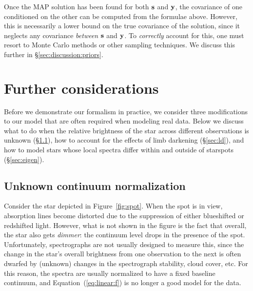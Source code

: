 \documentclass[modern]{aastex631}
\begin{document}
Once the MAP solution has been found for both ${\mathbf{s}}$ and ${\mathbf{y}}$, the covariance of one conditioned on the other can be computed from the formulae above. 
However, this is necessarily a lower bound on the true covariance of the solution, since it neglects any covariance \emph{between} ${\mathbf{s}}$ and ${\mathbf{y}}$. 
To \emph{correctly} account for this, one must resort to Monte Carlo methods or other sampling techniques. 
We discuss this further in \S\ref{sec:discussion:priors}.

\section{Further considerations}
\label{sec:bellswhistles}
%
Before we demonstrate our formalism in practice, we consider three modifications to our model that are often required when modeling real data. 
Below we discuss what to do when the relative brightness of the star across different observations is unknown (\S\ref{sec:norm}), how to account for the effects of limb darkening (\S\ref{sec:ld}), and how to model stars whose local spectra differ within and outside of starspots (\S\ref{sec:eigen}).

\subsection{Unknown continuum normalization}
\label{sec:norm}
%
Consider the star depicted in Figure~\ref{fig:spot}. 
When the spot is in view, absorption lines become distorted due to the suppression of either blueshifted or redshifted light. 
However, what is not shown in the figure is the fact that overall, the star also gets \emph{dimmer}: the continuum level drops in the presence of the spot. 
Unfortunately, spectrographs are not usually designed to measure this, since the change in the star's overall brightness from one observation to the next is often dwarfed by (unknown) changes in the spectrograph stability, cloud cover, etc.
For this reason, the spectra are usually normalized to have a fixed baseline continuum, and Equation~(\ref{eq:linear:f}) is no longer a good model for the data.
\end{document}
